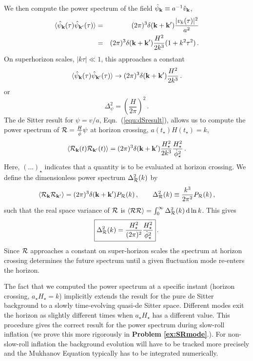 \documentclass[12pt,letterpaper,rotate]{article}
\def\beq{\begin{equation}}
\def\eeq{\end{equation}}
\def\bea{\begin{eqnarray}}
\def\eea{\end{eqnarray}}
\def\d{{\rm d}}
\def\R{{\cal R}}
\begin{document}
{We then compute the power spectrum of the field $\hat \psi_{\bf k} \equiv a^{-1}\hat v_{\bf k}$, %
\bea
 \langle \hat \psi_{\bf k}(\tau) \hat \psi_{{\bf k}'}(\tau)\rangle &=& (2\pi)^3 \delta({\bf k} + {\bf k}') \frac{|v_k(\tau)|^2}{a^2} \\ 
 &=& (2\pi)^3 \delta({\bf k} + {\bf k}') \frac{H^2}{2 k^3} (1 + k^2 \tau^2) \, .
 \eea
 On superhorizon scales, $|k \tau| \ll 1$, this approaches a constant
\beq
\label{equ:dSresult}
\langle \hat \psi_{\bf k}(\tau) \hat \psi_{{\bf k}'}(\tau)\rangle  \to (2\pi)^3 \delta({\bf k} + {\bf k}') \frac{H^2}{2k^3} \, .
\eeq
or 
\beq
\label{equ:psispec}
\Delta_\psi^2 = \left( \frac{H}{2\pi} \right)^2\, .
\eeq
The de Sitter result for $\psi = v/a$, Eqn.~(\ref{equ:dSresult}), allows us to compute the power spectrum of $\R = \frac{H}{\dot \phi} \psi$ at horizon crossing, $a(t_\star) H(t_\star) = k$,
\beq
\label{equ:maldaPs}
 \langle \R_{\bf k}(t) \R_{{\bf k}'}(t)  \rangle = (2 \pi)^3 \delta({\bf k} + {\bf k}') \frac{H^2_\star}{2k^3}  \frac{H^2_\star}{\dot \phi^2_\star}\, .
\eeq
Here, $(...)_\star$ indicates that a quantity is to be evaluated at horizon crossing.
We define the dimensionless power spectrum $\Delta_\R^2(k)$ by
\beq
 \langle \R_{\bf k} \R_{{\bf k}'}  \rangle =  (2 \pi)^3 \delta({\bf k} + {\bf k}') {P}_\R(k) \, , \qquad \Delta_\R^2(k) \equiv \frac{k^3}{2\pi^2} {P}_\R(k)\, ,
\eeq
such that the real space variance of $\R$ is $\langle \R \R \rangle = \int_0^\infty \Delta^2_\R(k) \, \d \ln k$.
This gives
\beq
\label{equ:maldaPs}
\fbox{$\displaystyle
\Delta^2_\R(k) = \frac{H_\star^2}{(2\pi)^2} \frac{H^2_\star}{\dot \phi^2_\star} $}\, .
\eeq
Since $\R$ approaches a constant on super-horizon scales the spectrum at horizon crossing determines the future spectrum until a given fluctuation mode re-enters the horizon.

The fact that we computed the power spectrum at a specific instant (horizon crossing, $a_\star H_\star = k$) implicitly extends the result for the pure de Sitter background to a slowly time-evolving quasi-de Sitter space. Different modes exit the horizon as slightly different times when $a_\star H_\star$ has a different value. This procedure gives the correct result for the power spectrum during slow-roll inflation (we prove this more rigorously in {\bf Problem \ref{ex:SRmode}}.).
For non-slow-roll inflation the background evolution will have to be tracked more precisely and the Mukhanov Equation typically has to be integrated numerically.



}
\end{document}
